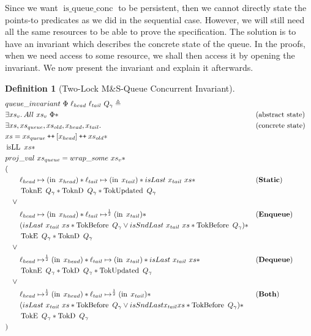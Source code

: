 \documentclass[a4paper, 11pt]{report}
\newtheorem{definition}{Definition}[section]
\newcommand{\isqueueconc}{\operatorname{is\_queue\_conc}}
\newcommand{\isLL}{\operatorname{isLL}}
\newcommand{\nIn}[1]{\operatorname{in} \; #1}
\newcommand{\StaticState}{\textbf{Static}}
\newcommand{\EnqueueState}{\textbf{Enqueue}}
\newcommand{\DequeueState}{\textbf{Dequeue}}
\newcommand{\BothState}{\textbf{Both}}
\newcommand{\Qg}{Q_\gname}
\newcommand{\TokE}[1]{\operatorname{TokE}\ #1}
\newcommand{\TokEQg}{\TokE{\Qg}}
\newcommand{\ToknE}[1]{\operatorname{ToknE}\ #1}
\newcommand{\ToknEQg}{\ToknE{\Qg}}
\newcommand{\TokD}[1]{\operatorname{TokD}\ #1}
\newcommand{\TokDQg}{\TokD{\Qg}}
\newcommand{\ToknD}[1]{\operatorname{ToknD}\ #1}
\newcommand{\ToknDQg}{\ToknD{\Qg}}
\newcommand{\TokBefore}[1]{\operatorname{TokBefore}\ #1}
\newcommand{\TokBeforeQg}{\TokBefore{\Qg}}
\newcommand{\TokAfterQg}{\TokBefore{\Qg}}
\newcommand{\TokUpdated}[1]{\operatorname{TokUpdated}\ #1}
\newcommand{\TokUpdatedQg}{\TokUpdated{\Qg}}
\newcommand\catenate{\mathbin{\text{\ttfamily\upshape ++}}}
\begin{document}
Since we want $\isqueueconc$ to be persistent, then we cannot directly state the points-to predicates as we did in the sequential case. However, we will still need all the same resources to be able to prove the specification. The solution is to have an invariant which describes the concrete state of the queue. In the proofs, when we need access to some resource, we shall then access it by opening the invariant. We now present the invariant and explain it afterwards.
\begin{definition}[Two-Lock M\&S-Queue Concurrent Invariant]\label{TLMSQ:spec:invariant}
  \begin{align*}
    &queue\_invariant \ \Phi \ \loc_{head} \ \loc_{tail} \ Q_\gname \eqdef\\
    &\Exists xs_v. All \ xs_v \ \Phi \star &&\text{(abstract state)}\\
    &\Exists xs, xs_{queue}, xs_{old}, x_{head}, x_{tail} . &&\text{(concrete state)}\\
    &xs = xs_{queue} \catenate [x_{head}] \catenate xs_{old} \star\\
    &\isLL \ xs \star\\
    &proj\_val \ xs_{queue} = wrap\_some \ xs_v \star\\
    &(\\
    &\quad\quad\loc_{head} \mapsto (\nIn{x_{head}}) \star \loc_{tail} \mapsto (\nIn{x_{tail}}) \star isLast \ x_{tail} \ xs \star &&\text{(\StaticState)}\\
    &\quad\quad \ToknEQg \star \ToknDQg \star \TokUpdatedQg\\
    &\quad\lor\\
    &\quad\quad\loc_{head} \mapsto (\nIn{x_{head}}) \star \loc_{tail} \mapsto^{\frac{1}{2}} (\nIn{x_{tail}}) \star &&\text{(\EnqueueState)}\\
    &\quad\quad (isLast \ x_{tail} \ xs \star \TokBeforeQg \lor isSndLast \ x_{tail} \ xs \star \TokAfterQg) \star\\
    &\quad\quad \TokEQg \star \ToknDQg\\
    &\quad\lor\\
    &\quad\quad\loc_{head} \mapsto^{\frac{1}{2}} (\nIn{x_{head}}) \star \loc_{tail} \mapsto (\nIn{x_{tail}}) \star isLast \ x_{tail} \ xs \star &&\text{(\DequeueState)}\\
    &\quad\quad \ToknEQg \star \TokDQg \star \TokUpdatedQg\\
    &\quad\lor\\
    &\quad\quad\loc_{head} \mapsto^{\frac{1}{2}} (\nIn{x_{head}}) \star \loc_{tail} \mapsto^{\frac{1}{2}} (\nIn{x_{tail}}) \star &&\text{(\BothState)}\\
    &\quad\quad (isLast \ x_{tail} \ xs \star \TokBeforeQg \lor isSndLast x_{tail} xs \star \TokAfterQg) \star\\
    &\quad\quad \TokEQg \star \TokDQg\\
    &)
  \end{align*}
\end{definition}
\end{document}
